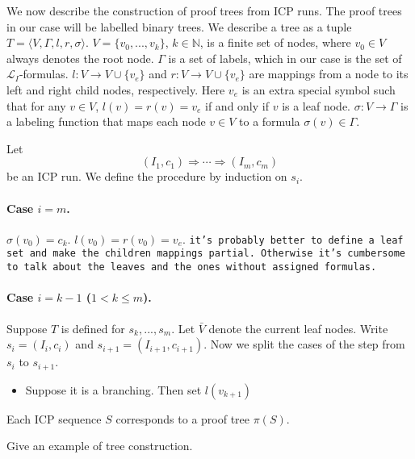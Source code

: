 \documentclass[envcountsect]{llncs}
\begin{document}
We now describe the construction of proof trees from ICP runs. The proof trees in
our case will be labelled binary trees. We describe a tree as a tuple $T = \langle V,
\Gamma, l, r, 
\sigma\rangle$. $V = \{v_0, ..., v_k\}$, $k\in \mathbb{N}$, is a finite set of nodes, where $v_0\in V$ always denotes the root
node. $\Gamma$ is a set of labels, which in our case is the set of
$\mathcal{L}_I$-formulas. $l: V \rightarrow V\cup\{v_e\}$ and $r: V\rightarrow V\cup\{v_e\}$ are
mappings from a node to
its left and right child nodes, respectively. Here $v_e$ is an extra special symbol
such that for any $v\in V$, $l(v) = r(v) = v_e$ if and only if $v$ is a leaf
node. $\sigma: V\rightarrow \Gamma$ is a labeling function that maps each node
$v\in V$ to a formula $\sigma(v) \in \Gamma$.

\begin{definition}
Let $$(I_1, c_1)\Longrightarrow \cdots \Longrightarrow (I_m, c_m)$$ be an ICP run. 
We define the procedure by induction on $s_i$.
\paragraph{Case $i= m$.} $\sigma(v_0) = c_k$. $l(v_0) = r(v_0) = v_e$. {\tt it's
probably better to define a leaf set and make the children mappings partial.
Otherwise it's cumbersome to talk about the leaves and the ones without
assigned formulas. } 
\paragraph{Case $i = k-1$ ($1< k \leq m$). }
Suppose $T$ is defined for $s_k,...,s_m$. Let $\bar V$ denote the current leaf
nodes. Write $s_i = (I_i, c_i)$ and $s_{i+1} = (I_{i+1}, c_{i+1})$. Now we split
the cases of the step from $s_i$ to $s_{i+1}$. 
\begin{itemize}
\item Suppose it is a branching. Then set $l(v_{k+1})$
\end{itemize}

\end{definition}

\begin{theorem}[ST-Correspondence]
Each ICP sequence $S$ corresponds to a proof tree $\pi(S)$.
\end{theorem}


\begin{example}
Give an example of tree construction. 
\end{example}
\end{document}
